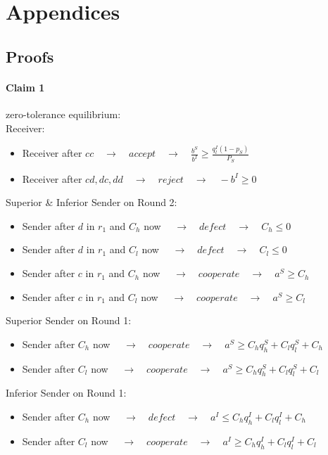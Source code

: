 \documentclass[11pt]{article}
\theoremstyle{plainCl1}
\begin{document}
\section{Appendices}

\subsection{Proofs}

\paragraph{Claim 1}zero-tolerance equilibrium:\\
Receiver:
\begin{itemize} [noitemsep]
	\item Receiver after $cc \quad \rightarrow \quad accept \quad \rightarrow \quad \frac{b^S}{b^I}\geq \frac{q^I_l (1-p_S)}{P_S}$\\
	\item Receiver after $cd, dc, dd \quad \rightarrow \quad reject \quad \rightarrow \quad -b^I \geq 0$\\
\end{itemize}
Superior \& Inferior Sender on Round 2:
\begin{itemize} [noitemsep]
	\item Sender after $d$ in $r_1$ and $C_h$ now $\quad \rightarrow \quad defect \quad \rightarrow \quad C_h \leq 0$\\
	\item Sender after $d$ in $r_1$ and $C_l$ now $\quad \rightarrow \quad defect \quad \rightarrow \quad C_l \leq 0$\\
	\item Sender  after $c$ in $r_1$ and $C_h$ now $\quad \rightarrow \quad cooperate \quad \rightarrow \quad a^S \geq C_h$\\
	\item Sender  after $c$ in $r_1$ and $C_l$ now $\quad \rightarrow \quad cooperate \quad \rightarrow \quad a^S \geq C_l$\\
\end{itemize}
Superior Sender on Round 1:
\begin{itemize} [noitemsep]
	\item Sender after $C_h$ now $\quad \rightarrow \quad cooperate \quad \rightarrow \quad a^S \geq C_h q^S_h + C_l q^S_l + C_h$\\
	\item Sender after $C_l$ now $\quad \rightarrow \quad cooperate \quad \rightarrow \quad a^S \geq C_h q^S_h + C_l q^S_l + C_l$\\
\end{itemize}
Inferior Sender on Round 1:
\begin{itemize} [noitemsep]
	\item Sender after $C_h$ now $\quad \rightarrow \quad defect \quad \rightarrow \quad a^I \leq C_h q^I_h + C_l q^I_l + C_h$\\
	\item Sender after $C_l$ now $\quad \rightarrow \quad cooperate \quad \rightarrow \quad a^I \geq C_h q^I_h + C_l q^I_l + C_l$\\
\end{itemize}
\end{document}
